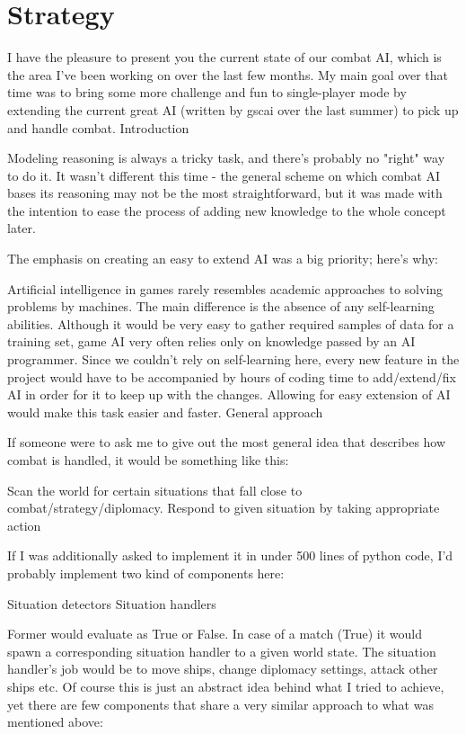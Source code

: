 \chapter{Strategy}

I have the pleasure to present you the current state of our combat AI, which is the area I've been working on over the last few months.
My main goal over that time was to bring some more challenge and fun to single-player mode by extending the current great AI (written by gscai over the last summer) to pick up and handle combat.
Introduction

Modeling reasoning is always a tricky task, and there's probably no "right" way to do it.
It wasn't different this time - the general scheme on which combat AI bases its reasoning may not be the most straightforward, but it was made with the intention to ease the process of adding new knowledge to the whole concept later.

The emphasis on creating an easy to extend AI was a big priority; here's why:

Artificial intelligence in games rarely resembles academic approaches to solving problems by machines.
The main difference is the absence of any self-learning abilities.
Although it would be very easy to gather required samples of data for a training set, game AI very often relies only on knowledge passed by an AI programmer.
Since we couldn't rely on self-learning here, every new feature in the project would have to be accompanied by hours of coding time to add/extend/fix AI in order for it to keep up with the changes.
Allowing for easy extension of AI would make this task easier and faster.
General approach

If someone were to ask me to give out the most general idea that describes how combat is handled, it would be something like this:

    Scan the world for certain situations that fall close to combat/strategy/diplomacy.
    Respond to given situation by taking appropriate action

If I was additionally asked to implement it in under 500 lines of python code, I'd probably implement two kind of components here:

    Situation detectors
    Situation handlers

Former would evaluate as True or False.
In case of a match (True) it would spawn a corresponding situation handler to a given world state.
The situation handler's job would be to move ships, change diplomacy settings, attack other ships etc.
Of course this is just an abstract idea behind what I tried to achieve, yet there are few components that share a very similar approach to what was mentioned above:


